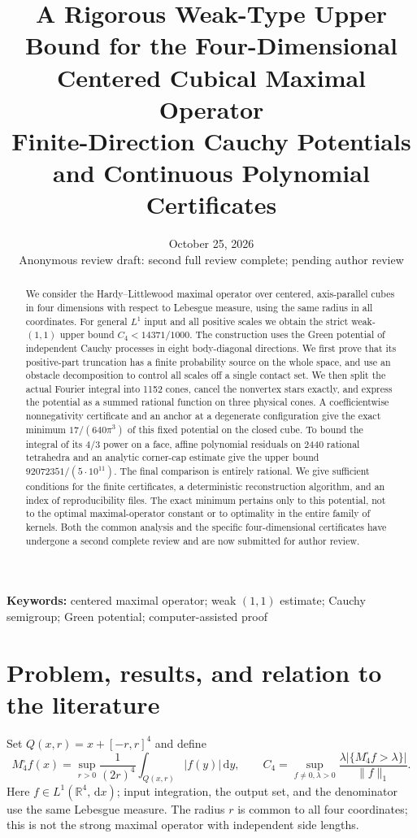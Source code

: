 \documentclass[11pt,a4paper]{article}
\title{A Rigorous Weak-Type Upper Bound for the Four-Dimensional Centered Cubical Maximal Operator\\\large Finite-Direction Cauchy Potentials and Continuous Polynomial Certificates}
\author{}
\date{October 25, 2026\\\normalsize Anonymous review draft: second full review complete; pending author review}
\theoremstyle{remark}\newtheorem{remark}[theorem]{Remark}
\newcommand{\R}{\mathbb R}\newcommand{\dd}{\,\mathrm d}
\newcommand{\1}{\mathbf1}\newcommand{\pos}[1]{(#1)_+}
\begin{document}
\maketitle
\begin{abstract}
We consider the Hardy--Littlewood maximal operator over centered, axis-parallel cubes in four dimensions with respect to Lebesgue measure, using the same radius in all coordinates. For general $L^1$ input and all positive scales we obtain the strict weak-$(1,1)$ upper bound $C_4<14371/1000$. The construction uses the Green potential of independent Cauchy processes in eight body-diagonal directions. We first prove that its positive-part truncation has a finite probability source on the whole space, and use an obstacle decomposition to control all scales off a single contact set. We then split the actual Fourier integral into 1152 cones, cancel the nonvertex stars exactly, and express the potential as a summed rational function on three physical cones. A coefficientwise nonnegativity certificate and an anchor at a degenerate configuration give the exact minimum $17/(640\pi^3)$ of this fixed potential on the closed cube. To bound the integral of its $4/3$ power on a face, affine polynomial residuals on 2440 rational tetrahedra and an analytic corner-cap estimate give the upper bound $92072351/(5\cdot10^{11})$. The final comparison is entirely rational. We give sufficient conditions for the finite certificates, a deterministic reconstruction algorithm, and an index of reproducibility files. The exact minimum pertains only to this potential, not to the optimal maximal-operator constant or to optimality in the entire family of kernels. Both the common analysis and the specific four-dimensional certificates have undergone a second complete review and are now submitted for author review.
\end{abstract}
\noindent\textbf{Keywords:} centered maximal operator; weak $(1,1)$ estimate; Cauchy semigroup; Green potential; computer-assisted proof
\tableofcontents

\section{Problem, results, and relation to the literature}
Set $Q(x,r)=x+[-r,r]^4$ and define
\[
 M^\square_4f(x)=\sup_{r>0}\frac1{(2r)^4}\int_{Q(x,r)}|f(y)|\dd y,
 \qquad
 C_4=\sup_{f\ne0,\lambda>0}
 \frac{\lambda|\{M^\square_4f>\lambda\}|}{\|f\|_1}.
\]
Here $f\in L^1(\R^4,\dd x)$; input integration, the output set, and the denominator use the same Lebesgue measure. The radius $r$ is common to all four coordinates; this is not the strong maximal operator with independent side lengths.
\end{document}
